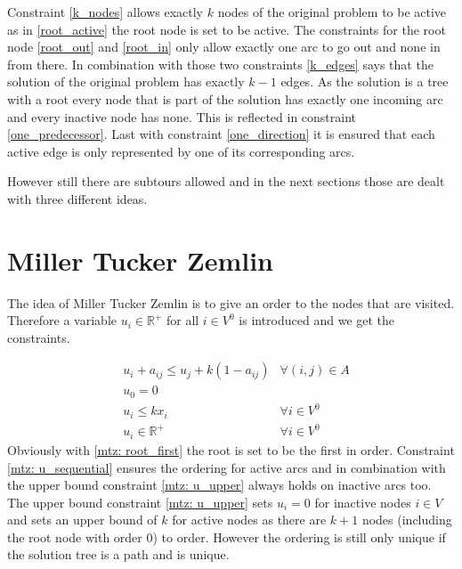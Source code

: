 \documentclass{article}
\newcommand{\R}{\mathbb{R}}
\begin{document}
	Constraint \eqref{k_nodes} allows exactly $k$ nodes of the original problem to be active as in \eqref{root_active} the root node is set to be active. The constraints for the root node \eqref{root_out} and \eqref{root_in} only allow exactly one arc to go out and none in from there. In combination with those two constraints \eqref{k_edges} says that the solution of the original problem has exactly $k-1$ edges. As the solution is a tree with a root every node that is part of the solution has exactly one incoming arc and every inactive node has none. This is reflected in constraint \eqref{one_predecessor}. Last with constraint \eqref{one_direction} it is ensured that each active edge is only represented by one of its corresponding arcs.
	
	However still there are subtours allowed and in the next sections those are dealt with three different ideas.
	
	\section{Miller Tucker Zemlin}
	
	The idea of Miller Tucker Zemlin is to give an order to the nodes that are visited. Therefore a variable $u_i \in \R^+$ for all $i \in V^0$ is introduced and we get the constraints.
	
	\begin{align}		
		& u_i + a_{ij} \leq u_j + k (1-a_{ij}) & \forall (i, j) \in A \label{mtz: u_sequential} \\
		& u_0 = 0 \label{mtz: root_first} \\	
		& u_i \leq k x_i &\forall i \in V^0 \label{mtz: u_upper} \\	
		& u_i \in \R^+ & \forall i \in V^0 \label{mtz: u}
	\end{align}	
	Obviously with \eqref{mtz: root_first} the root is set to be the first in order. Constraint \eqref{mtz: u_sequential} ensures the ordering for active arcs and in combination with the upper bound constraint \eqref{mtz: u_upper} always holds on inactive arcs too. The upper bound constraint \eqref{mtz: u_upper} sets $u_i=0$ for inactive nodes $i \in V$ and sets an upper bound of $k$ for active nodes as there are $k+1$ nodes (including the root node with order $0$) to order. However the ordering is still only unique if the solution tree is a path and is unique.	
	
\end{document}
